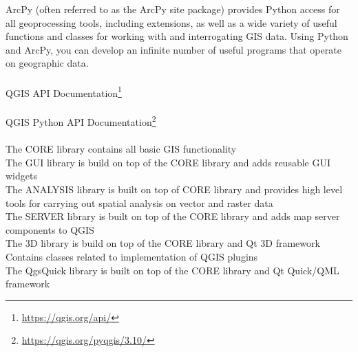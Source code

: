 ArcPy (often referred to as the ArcPy site package) provides Python access for all geoprocessing tools, including extensions, as well as a wide variety of useful functions and classes for working with and interrogating GIS data. Using Python and ArcPy, you can develop an infinite number of useful programs that operate on geographic data.
\\\\
QGIS API Documentation\footnote{\url{https://qgis.org/api/}}
\\\\
QGIS Python API Documentation\footnote{\url{https://qgis.org/pyqgis/3.10/}}
\\\\
The CORE library contains all basic GIS functionality\\
The GUI library is build on top of the CORE library and adds reusable GUI widgets\\
The ANALYSIS library is built on top of CORE library and provides high level tools for carrying out spatial analysis on vector and raster data\\
The SERVER library is built on top of the CORE library and adds map server components to QGIS\\
The 3D library is build on top of the CORE library and Qt 3D framework\\
Contains classes related to implementation of QGIS plugins\\
The QgsQuick library is built on top of the CORE library and Qt Quick/QML framework